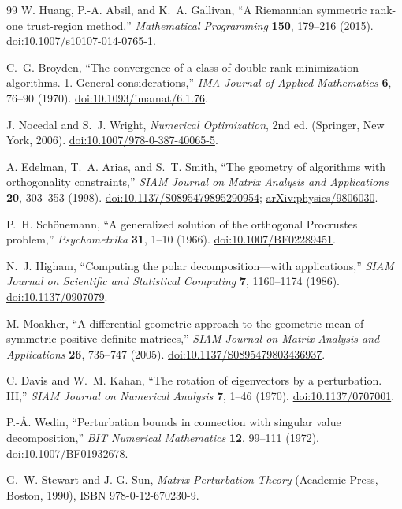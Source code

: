\documentclass[10pt,twocolumn]{article}
\theoremstyle{definition}
\theoremstyle{remark}
\begin{document}
{\begin{thebibliography}{99}
W. Huang, P.-A. Absil, and K.~A. Gallivan,
“A Riemannian symmetric rank-one trust-region method,”
\emph{Mathematical Programming} \textbf{150}, 179--216 (2015).
\href{https://doi.org/10.1007/s10107-014-0765-1}{doi:10.1007/s10107-014-0765-1}.

C.~G. Broyden,
“The convergence of a class of double-rank minimization algorithms. 1. General considerations,”
\emph{IMA Journal of Applied Mathematics} \textbf{6}, 76--90 (1970).
\href{https://doi.org/10.1093/imamat/6.1.76}{doi:10.1093/imamat/6.1.76}.

J. Nocedal and S.~J. Wright,
\emph{Numerical Optimization}, 2nd ed.
(Springer, New York, 2006).
\href{https://doi.org/10.1007/978-0-387-40065-5}{doi:10.1007/978-0-387-40065-5}.

A. Edelman, T.~A. Arias, and S.~T. Smith,
“The geometry of algorithms with orthogonality constraints,”
\emph{SIAM Journal on Matrix Analysis and Applications} \textbf{20}, 303--353 (1998).
\href{https://doi.org/10.1137/S0895479895290954}{doi:10.1137/S0895479895290954};
\href{https://arxiv.org/abs/physics/9806030}{arXiv:physics/9806030}.

P.~H. Sch\"onemann,
“A generalized solution of the orthogonal Procrustes problem,”
\emph{Psychometrika} \textbf{31}, 1--10 (1966).
\href{https://doi.org/10.1007/BF02289451}{doi:10.1007/BF02289451}.

N.~J. Higham,
“Computing the polar decomposition---with applications,”
\emph{SIAM Journal on Scientific and Statistical Computing} \textbf{7}, 1160--1174 (1986).
\href{https://doi.org/10.1137/0907079}{doi:10.1137/0907079}.

M. Moakher,
“A differential geometric approach to the geometric mean of symmetric positive-definite matrices,”
\emph{SIAM Journal on Matrix Analysis and Applications} \textbf{26}, 735--747 (2005).
\href{https://doi.org/10.1137/S0895479803436937}{doi:10.1137/S0895479803436937}.

C. Davis and W.~M. Kahan,
“The rotation of eigenvectors by a perturbation. III,”
\emph{SIAM Journal on Numerical Analysis} \textbf{7}, 1--46 (1970).
\href{https://doi.org/10.1137/0707001}{doi:10.1137/0707001}.

P.-\AA. Wedin,
“Perturbation bounds in connection with singular value decomposition,”
\emph{BIT Numerical Mathematics} \textbf{12}, 99--111 (1972).
\href{https://doi.org/10.1007/BF01932678}{doi:10.1007/BF01932678}.

G.~W. Stewart and J.-G. Sun,
\emph{Matrix Perturbation Theory}
(Academic Press, Boston, 1990), ISBN 978-0-12-670230-9.

\end{thebibliography}
}
\end{document}
